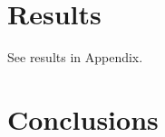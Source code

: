 \documentclass[ProjectKWK]{subfiles}
\begin{document}
\hypertarget{Results}{}
\section{Results}

See results in Appendix.


\hypertarget{Conclusions}{}
\section{Conclusions}






\onlyinsubfile{}
%
\end{document}
